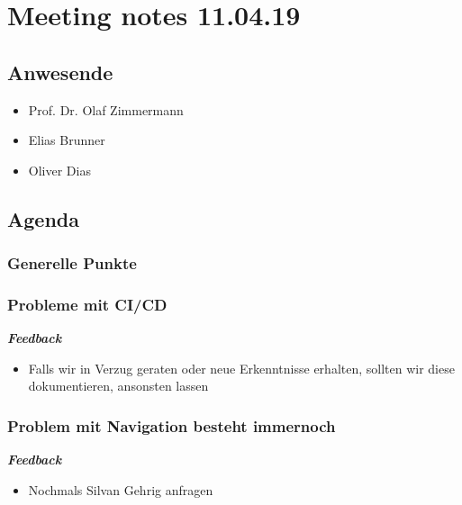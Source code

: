 \hypertarget{meeting-notes-110419}{%
\section*{Meeting notes 11.04.19}\label{meeting-notes-110419}}

\hypertarget{anwesende}{%
\subsection*{Anwesende}\label{anwesende}}

\begin{itemize}
\item
  Prof. Dr. Olaf Zimmermann
\item
  Elias Brunner
\item
  Oliver Dias
\end{itemize}

\hypertarget{agenda}{%
\subsection*{Agenda}\label{agenda}}

\hypertarget{generelle-punkte}{%
\subsubsection*{Generelle Punkte}\label{generelle-punkte}}

\hypertarget{probleme-mit-cicd}{%
\subsubsection*{Probleme mit CI/CD}\label{probleme-mit-cicd}}

\emph{\textbf{Feedback}}

\begin{itemize}
\item
  Falls wir in Verzug geraten oder neue Erkenntnisse erhalten, sollten wir diese dokumentieren, ansonsten lassen
\end{itemize}

\hypertarget{problem-mit-navigation-besteht-immernoch}{%
\subsubsection*{Problem mit Navigation besteht
immernoch}\label{problem-mit-navigation-besteht-immernoch}}

\emph{\textbf{Feedback}}

\begin{itemize}

\item
  Nochmals Silvan Gehrig anfragen
\end{itemize}

